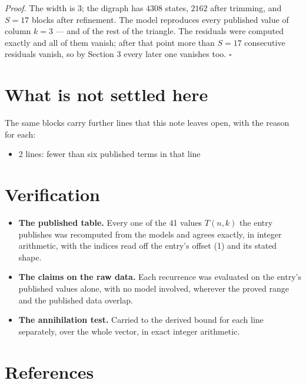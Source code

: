 \documentclass[11pt]{article}
\theoremstyle{definition}
\begin{document}
{\itshape Proof.} The width is $3$; the digraph has $4308$ states, $2162$ after trimming, and $S = 17$ blocks after refinement. The model reproduces every published value of column $k = 3$ --- and of the rest of the triangle. The residuals were computed exactly and all of them vanish; after that point more than $S = 17$ consecutive residuals vanish, so by Section 3 every later one vanishes too. $\square$

\section{What is not settled here}

The same blocks carry further lines that this note leaves open, with the reason for each:

\begin{itemize}

\item 2 lines: fewer than six published terms in that line

\end{itemize}

\section{Verification}

\begin{itemize}

\item {\bfseries The published table.} Every one of the 41 values $T(n,k)$ the entry publishes was recomputed from the models and agrees exactly, in integer arithmetic, with the indices read off the entry's offset (1) and its stated shape.

\item {\bfseries The claims on the raw data.} Each recurrence was evaluated on the entry's published values alone, with no model involved, wherever the proved range and the published data overlap.

\item {\bfseries The annihilation test.} Carried to the derived bound for each line separately, over the whole vector, in exact integer arithmetic.

\end{itemize}

\section{References}
\end{document}
